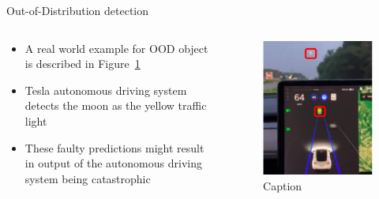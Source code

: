 \documentclass[aspectratio=169]{beamer}
\begin{document}
\begin{frame}{Out-of-Distribution detection}
 \begin{columns}
    \begin{column}{0.5\textwidth}
        \begin{itemize}
            \item A real world example for OOD object is described in Figure~\ref{fig:eg_tesla_moon}
            \item Tesla autonomous driving system detects the moon as the yellow traffic light
            \item These faulty predictions might result in output of the autonomous driving system being catastrophic
        \end{itemize}
    \end{column}
    \begin{column}{0.5\textwidth}
     \begin{figure}
         \centering
         \includegraphics[scale=0.25]{images/Tesla_ex_moon.jpg}
         \caption{Caption}
         \label{fig:eg_tesla_moon}
     \end{figure}
    \end{column}
 \end{columns}
\end{frame}
\end{document}
